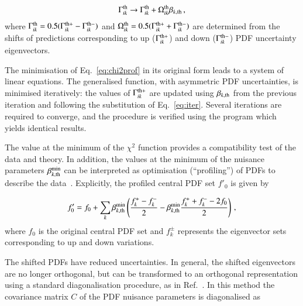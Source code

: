 \begin{eqnarray}
   \Gamma^{\rm th}_{ik} \to \Gamma^{\rm th}_{ik} +  \Omega^{\rm th}_{ik}\beta_{k, \rm th}\,, \label{eq:iter}
\end{eqnarray}
where $\Gamma^{\rm th}_{ik} = 0.5(\Gamma^{\rm th+}_{ik} - \Gamma^{\rm
th-}_{ik})$ and $\Omega^{\rm th}_{ik} = 0.5(\Gamma^{\rm th+}_{ik}
+ \Gamma^{\rm th-}_{ik})$ are determined from the shifts of
predictions corresponding to up ($\Gamma^{\rm th+}_{ik}$) and down
($ \Gamma^{\rm th-}_{ik}$) PDF uncertainty eigenvectors.

The minimisation of Eq.~\ref{eq:chi2prof} in its original form leads
to a system of linear equations. The generalised function, with
asymmetric PDF uncertainties, is minimised iteratively: the values of $\Gamma^{\rm
th+}_{ik}$ are updated using $\beta_{k, \rm th}$ from the
previous iteration and following the substitution of Eq.~\ref{eq:iter}.
Several iterations are required to converge, and the procedure is verified
using the \minuit program which yields identical results.

The value at the minimum of the $\chi^2$ function provides a
compatibility test of the data and theory.
In addition, the values at the minimum of the nuisance parameters
$\beta^{\rm min}_{k,\rm th}$ can be interpreted as optimisation
(``profiling'') of PDFs to describe the data~\cite{Paukkunen:2014zia}. Explicitly, the profiled
central PDF set $f'_0$ is given by

\begin{equation}
   f'_0 = f_0 + \sum_k  \beta^{\rm min}_{k, {\rm
   th}} \left( \frac{f^{+}_k - f^{-}_k}{2}  - \beta^{\rm min}_{k, {\rm th}}  \frac{f^{+}_k + f^{-}_k - 2f_0}{2} \right)\,, \label{eq:prof}
\end{equation}
where $f_0$ is the original central PDF set and $f^{\pm}_k$ represents the
eigenvector sets corresponding to up and down variations.

The shifted PDFs have reduced uncertainties. In general, the
shifted eigenvectors are no longer orthogonal, but can be transformed
to an orthogonal representation using a standard diagonalisation
procedure, as in Ref.~\cite{Aaron:2009bp}.
In this method the covariance matrix $C$ of the PDF nuisance
parameters is diagonalised as

